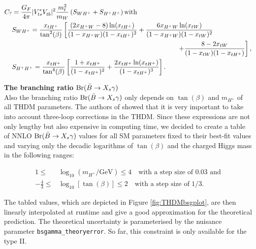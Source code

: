 \documentclass[aps,superscriptaddress,nofootinbib,floatfix,notitlepage]{revtex4-1}
\begin{document}
\begin{align}
C_?&=\frac{G_F}{4\pi} |V_{ts}^*V_{tb}^{\phantom{*}}|^2 \frac{m_t^2}{m_W} \left( S_{WH^+}+S_{H^+H^+}\right)
\text{with} \nonumber \\
&S_{WH^+}=\frac{x_{tH^+}}{\tan^2(\beta)}\left[ \frac{(2x_{H^+W}-8)\ln (x_{tH^+})}{(1-x_{H^+W})(1-x_{tH^+})^2} +\frac{6x_{H^+W}\ln (x_{tW})}{(1-x_{H^+W})(1-x_{tW})^2} \right. \nonumber \\
&\hspace*{250pt} \left. +\frac{8-2x_{tW}}{(1-x_{tW})(1-x_{tH^+})}\right] ,\nonumber \\
&S_{H^+H^+}=\frac{x_{tH^+}}{\tan^4(\beta)}\left[ \frac{1+x_{tH^+}}{(1-x_{tH^+})^2} +\frac{2x_{tH^+}\ln (x_{tH^+})}{(1-x_{tH^+})^3} \right] .\nonumber
\end{align}

\textbf{The branching ratio ${\rm Br}(\bar{B}\to X_s\gamma)$}\\

Also the branching ratio ${\rm Br}(\bar{B}\to X_s\gamma)$ only depends on $\tan (\beta)$ and $m_{H^+}$ of all THDM parameters. The authors of \cite{Misiak:2015xwa} showed that it is very important to take into account three-loop corrections in the THDM. Since these expressions are not only lengthy but also expensive in computing time, we decided to create a table of NNLO ${\rm Br}(\bar{B}\to X_s\gamma)$ values for all SM parameters fixed to their best-fit values and varying only the decadic logarithms of $\tan (\beta)$ and the charged Higgs mass in the following ranges:

\begin{align}
 1\leq & \log_{10} (m_{H^+}/\text{GeV})\leq 4 \quad \text{with a step size of 0.03 and}\nonumber \\
 -\frac43 \leq & \log_{10} [\tan(\beta)]\leq 2 \quad \text{with a step size of 1/3.}\nonumber 
\end{align}

The tabled values, which are depicted in Figure \ref{fig:THDMbsgplot}, are then linearly interpolated at runtime and give a good approximation for the theoretical prediction. The theoretical uncertainty is parameterised by the nuisance parameter \texttt{bsgamma\_theoryerror}. So far, this constraint is only available for the type II.\\
\end{document}
